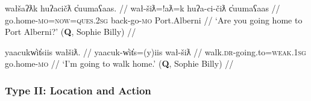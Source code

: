 \ex \label{ex:gohometoalberni}
\begingl
\glpreamble wałšaʔƛk huʔacičƛ c̓uumaʕaas. //
\gla wał-šiƛ=!aƛ=k huʔa-ci-čiƛ c̓uumaʕaas  //
\glb go.home-\textsc{mo}=\textsc{now}=\textsc{ques.2sg} back-go-\textsc{mo} Port.Alberni //
\glft `Are you going home to Port Alberni?' (\textbf{Q}, Sophie Billy) //
\endgl
\xe

\ex \label{ex:goingtowalkhome}
\begingl
\glpreamble yaacukw̓it̓siis wałšiƛ. //
\gla yaacuk-w̓it̓s=(y)iis wał-šiƛ  //
\glb walk.\textsc{dr}-going.to=\textsc{weak.1sg} go.home-\textsc{mo} //
\glft `I'm going to walk home.' (\textbf{Q}, Sophie Billy) //
\endgl
\xe

\begin{comment}
\ex \label{ex:movetovictoria1}
\begingl
\glpreamble ʔucičƛiis šiiƛuk mituunii. //
\gla ʔu-ci-čiƛ=(y)iis šiiƛuk mituunii  //
\glb \textsc{x}-go-\textsc{mo}=\textsc{weak.1sg} move.house.\textsc{dr} Victoria //
\glft `I moved to Victoria.' (\textbf{Q}, Sophie Billy) //
\endgl
\xe

[[TODO: šiiƛuk is ambiguous between PF and IMPF, so don’t use it, use one of SB’s other examples.]]

\ex~ \label{ex:movetovictoria2}
\begingl
\glpreamble ʔuuct̓iiḥiis šiiƛuk mituunii. //
\gla ʔuuct̓iiḥ=(y)iis šiiƛuk mituunii  //
\glb go.toward.\textsc{dr}=\textsc{weak.1sg} move.house.\textsc{dr} Victoria //
\glft `I moved to Victoria.' (\textbf{Q}, Sophie Billy) //
\endgl
\xe
\end{comment}

\begin{comment}
Ordering preference. One of my speakers expressed a strong preference for the manner verb to precede the action. This mirrors how adverbs are used in Nuuchahnulth, which also tend to precede the verb. Other speakers I consulted with were comfortable with the verbs coming in either order.

\ex \label{ex:gohomedrive}
\begingl
\glpreamble ʔucičƛsiš šiiƛuk mituuni. //
\gla ʔu-ci-čiƛ=siˑš šiiƛuk mituuni  //
\glb \textsc{x}-go-\textsc{mo}=\textsc{strg.1sg} move.house-\textsc{dr} Victoria //
\glft `I moved to Victoria.' (\textbf{Q}, Sophie Billy) //
\endgl
\xe
FH
*waałšiʔaƛs ƛiiƛiiḥataḥ.
waałšiʔaƛs. ƛiiƛiiḥataḥʔaƛs.
\end{comment}

\vspace{10pt}

\subsubsection{Type II: Location and Action} \label{ch:sv:data:type2}

